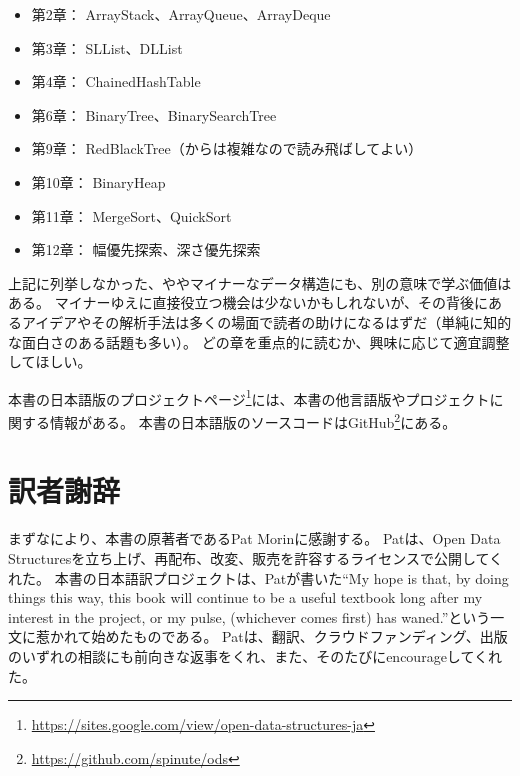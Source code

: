 \begin{itemize}
  \item 第2章： ArrayStack、ArrayQueue、ArrayDeque
  \item 第3章： SLList、DLList
  \item 第4章： ChainedHashTable
  \item 第6章： BinaryTree、BinarySearchTree
  \item 第9章： RedBlackTree（からは複雑なので読み飛ばしてよい）
  \item 第10章： BinaryHeap
  \item 第11章： MergeSort、QuickSort
  \item 第12章： 幅優先探索、深さ優先探索
\end{itemize}

上記に列挙しなかった、ややマイナーなデータ構造にも、別の意味で学ぶ価値はある。
マイナーゆえに直接役立つ機会は少ないかもしれないが、その背後にあるアイデアやその解析手法は多くの場面で読者の助けになるはずだ（単純に知的な面白さのある話題も多い）。
どの章を重点的に読むか、興味に応じて適宜調整してほしい。

本書の日本語版のプロジェクトページ\footnote {\url{https://sites.google.com/view/open-data-structures-ja}}には、本書の他言語版やプロジェクトに関する情報がある。
本書の日本語版のソースコードはGitHub\footnote {\url{https://github.com/spinute/ods}}にある。

\section*{訳者謝辞}

まずなにより、本書の原著者であるPat Morinに感謝する。
Patは、Open Data Structuresを立ち上げ、再配布、改変、販売を許容するライセンスで公開してくれた。
本書の日本語訳プロジェクトは、Patが書いた``My hope is that, by doing things this way, this book will continue to be a useful textbook long after my interest in the project, or my pulse, (whichever comes first) has waned.''という一文に惹かれて始めたものである。
Patは、翻訳、クラウドファンディング、出版のいずれの相談にも前向きな返事をくれ、また、そのたびにencourageしてくれた。

